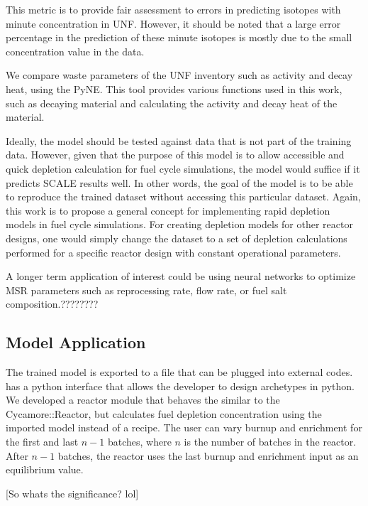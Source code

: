 This metric is to provide fair assessment to errors
in predicting isotopes with minute concentration in \gls{UNF}.
However, it should be noted that a large error percentage in the
prediction of these minute isotopes is mostly due to the
small concentration value in the data.

We compare waste parameters of the \gls{UNF} inventory
such as activity and decay heat, using the
\gls{PyNE}. This tool provides various functions used
in this work, such as decaying material and calculating
the activity and decay heat of the material.

Ideally, the model should be tested against data
that is not part of the training data. However, given
that the purpose of this model is to allow accessible and
quick depletion calculation for
fuel cycle simulations, the model would suffice if
it predicts SCALE results well. In other words, the
goal of the model is to be able to reproduce the
trained dataset without accessing this particular dataset.
Again, this work
is to propose a general concept for implementing
rapid depletion models in fuel cycle simulations.
For creating depletion models for other reactor designs,
one would simply change the dataset to a set of depletion
calculations performed for a specific reactor design with
constant operational parameters.

A longer term application of interest could be using
neural networks to optimize \gls{MSR} parameters
such as reprocessing rate, flow rate, or fuel
salt composition.????????


\subsection{Model Application}

The trained model is exported to a file
that can be plugged into external codes. \Cyclus
has a python interface that allows the developer
to design archetypes in python. We developed a reactor
module that behaves the similar to the Cycamore::Reactor,
but calculates fuel depletion concentration using the
imported model instead of a recipe. The user can vary
burnup and enrichment for the first and last $n-1$ batches,
where $n$ is the number of batches in the reactor. After
$n-1$ batches, the reactor uses the last burnup and enrichment
input as an equilibrium value.

[So whats the significance? lol]